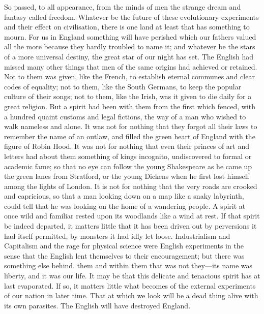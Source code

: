 \documentclass{book}
\begin{document}
So passed, to all appearance, from the minds of men the strange dream and fantasy called freedom. Whatever be the future of these evolutionary experiments and their effect on civilisation, there is one land at least that has something to mourn. For us in England something will have perished which our fathers valued all the more because they hardly troubled to name it; and whatever be the stars of a more universal destiny, the great star of our night has set. The English had missed many other things that men of the same origins had achieved or retained. Not to them was given, like the French, to establish eternal communes and clear codes of equality; not to them, like the South Germans, to keep the popular culture of their songs; not to them, like the Irish, was it given to die daily for a great religion. But a spirit had been with them from the first which fenced, with a hundred quaint customs and legal fictions, the way of a man who wished to walk nameless and alone. It was not for nothing that they forgot all their laws to remember the name of an outlaw, and filled the green heart of England with the figure of Robin Hood. It was not for nothing that even their princes of art and letters had about them something of kings incognito, undiscovered to formal or academic fame; so that no eye can follow the young Shakespeare as he came up the green lanes from Stratford, or the young Dickens when he first lost himself among the lights of London. It is not for nothing that the very roads are crooked and capricious, so that a man looking down on a map like a snaky labyrinth, could tell that he was looking on the home of a wandering people. A spirit at once wild and familiar rested upon its woodlands like a wind at rest. If that spirit be indeed departed, it matters little that it has been driven out by perversions it had itself permitted, by monsters it had idly let loose. Industrialism and Capitalism and the rage for physical science were English experiments in the sense that the English lent themselves to their encouragement; but there was something else behind. them and within them that was not they—its name was liberty, and it was our life. It may be that this delicate and tenacious spirit has at last evaporated. If so, it matters little what becomes of the external experiments of our nation in later time. That at which we look will be a dead thing alive with its own parasites. The English will have destroyed England.
\end{document}
